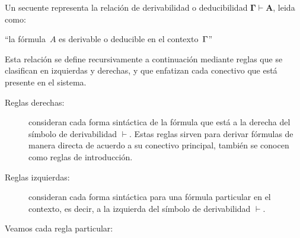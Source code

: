 \documentclass[11pt,letterpaper]{article}
\begin{document}
Un secuente representa la relación de derivabilidad o deducibilidad 
$\mathbf{\Gamma \vdash A}$, leida como: 
\begin{center}
\enquote{la fórmula~$A$ es derivable o deducible en el contexto~$\Gamma$}
\end{center}
Esta relaci\'on se define recursivamente a continuación mediante reglas que se 
clasifican en izquierdas y derechas, y que enfatizan cada conectivo que est\'a 
presente en el sistema.
\begin{description}
\item[Reglas derechas:] consideran cada forma sintáctica de la fórmula que
  está a la derecha del símbolo de derivabilidad $\vdash$. Estas reglas sirven
  para derivar fórmulas de manera directa de acuerdo a su conectivo
  principal, también se conocen como reglas de introducción. 
\item[Reglas izquierdas:] consideran cada forma sintáctica para una fórmula
  particular en el contexto, es decir, a la izquierda del símbolo de
  derivabilidad $\vdash$. 
\end{description}


Veamos cada regla particular:
\end{document}
